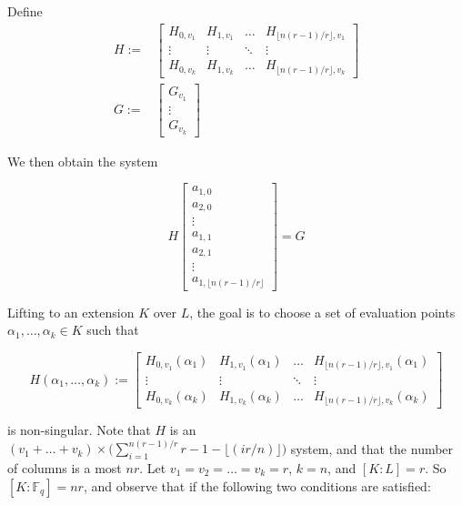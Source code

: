 \documentclass[sigconf]{acmart}
\newcommand{\F}{\mathbb{F}}
\begin{document}
Define
\begin{align*}
H:= & \begin{bmatrix}
H_{0,v_1} & H_{1, v_1} & \ldots & H_{\lfloor n (r- 1)/r \rfloor, v_1} \\ \vdots & \vdots & \ddots & \vdots \\ H_{0,v_k} & H_{1, v_k} & \ldots & H_{\lfloor n (r-1)/r \rfloor, v_k}
\end{bmatrix}\\
G:= & \begin{bmatrix}
G_{v_1} \\ \vdots \\ G_{v_k}
\end{bmatrix}
\end{align*}

We then obtain the system

\begin{equation*}
H
\begin{bmatrix}
a_{1,0} \\ a_{2,0} \\ \vdots \\ a_{1,1} \\ a_{2,1} \\ \vdots \\ a_{1, \lfloor n (r-1)/r \rfloor}
\end{bmatrix} = G
\end{equation*}

Lifting to an extension $K$ over $L$, the goal is to choose a set of evaluation points $\alpha_1, \ldots, \alpha_k \in K$ such that

\begin{equation*}
    H(\alpha_1, \ldots, \alpha_k) := \begin{bmatrix}
H_{0,v_1}(\alpha_1) & H_{1, v_1}(\alpha_1) & \ldots & H_{\lfloor n (r-1)/r \rfloor, v_1}(\alpha_1) \\ \vdots & \vdots & \ddots & \vdots \\ H_{0,v_k}(\alpha_k) & H_{1, v_k}(\alpha_k) & \ldots & H_{\lfloor n (r-1)/r\rfloor, v_k}(\alpha_k)
\end{bmatrix}
\end{equation*}

is non-singular. Note that $H$ is an $ (v_1 + \ldots + v_k) \times \bigg( \sum_{i=1}^{n(r-1)/r} r - 1 - \lfloor(i r/n) \rfloor \bigg)$ system, and that the number of columns is a most $nr$. Let $v_1 = v_2 = \ldots = v_k = r$, $k = n$, and $[K:L] = r$. So $[K:\F_q] = nr$, and observe that if the following two conditions are satisfied:
\end{document}
